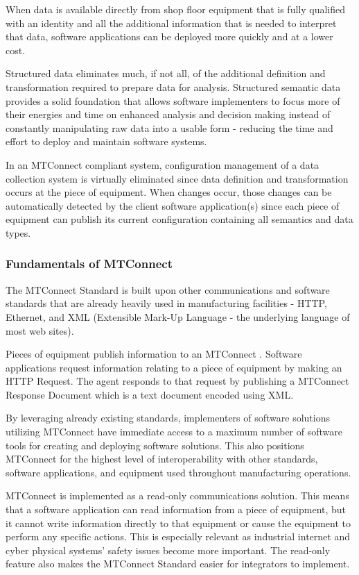 When data is available directly from shop floor equipment that is fully qualified with an identity and all the  additional information that is needed to interpret that data, software applications can be deployed more quickly and at a lower cost.    

Structured data eliminates much, if not all, of the additional definition and transformation required to prepare data for analysis.   Structured semantic data provides a solid foundation that allows software implementers to focus more of their energies and time on enhanced analysis and decision making instead of constantly manipulating raw data into a usable form - reducing the time and effort to deploy and maintain software systems.  
 
In an MTConnect compliant system, configuration management of a data collection system is virtually eliminated since data definition and transformation occurs at the piece of equipment.   When changes occur, those changes can be automatically detected by the client software application(s) since each piece of equipment can publish its current configuration containing all semantics and data types.

\subsubsection{Fundamentals of MTConnect}

The MTConnect Standard is built upon other communications and software standards that are already heavily used in manufacturing facilities - HTTP, Ethernet, and XML (Extensible Mark-Up Language - the underlying language of most web sites).
 
Pieces of equipment publish information to an MTConnect .  Software applications request information relating to a piece of equipment by making an HTTP Request. The agent responds to that request by publishing a MTConnect Response Document which is a text document encoded using XML.   
 
By leveraging already existing standards, implementers of software solutions utilizing MTConnect have immediate access to a maximum number of software tools for creating and deploying software solutions.   This also positions MTConnect for the highest level of interoperability with other standards, software applications, and equipment used throughout manufacturing operations.    
 
MTConnect is implemented as a read-only communications solution.   This means that a software application can read information from a piece of equipment, but it cannot write information directly to that equipment or cause the equipment to perform any specific actions.  This is especially relevant as industrial internet and cyber physical systems' safety issues become more important.  The read-only feature also makes the MTConnect Standard easier for integrators to implement. 
 
